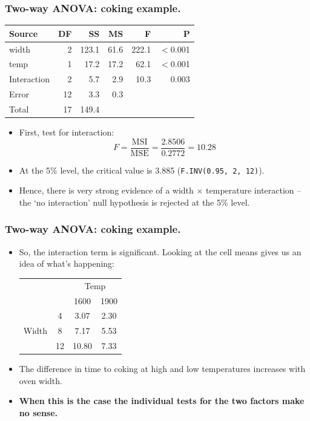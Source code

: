 \documentclass[12pt,xcolor=dvipsnames,handout,mathserif,aspectratio=169]{beamer}
\begin{document}
\begin{frame}
\frametitle{Two-way ANOVA: coking example.}
\begin{center}
\begin{tabular}{lrrrrr} \hline
Source    &   DF &      SS  &     MS  &     F &     P\\\hline
width      &   2 & 123.1  &61.6  &222.1  & $<$0.001\\
temp        &  1   &17.2  &17.2  & 62.1  & $<$0.001\\
Interaction &  2   & 5.7  & 2.9   &10.3  &0.003\\
Error       & 12   & 3.3  & 0.3 &&\\\hline
Total      &  17 & 149.4 &&&\\\hline
\end{tabular}
\end{center}
\vspace*{0.5cm}
\begin{itemize}
\item First, test for interaction:
$$F = \frac{\mbox{MSI}}{\mbox{MSE}}  = \frac{2.8506}{0.2772} = 10.28$$
\item At the 5\% level, the critical value is 3.885 (\texttt{F.INV(0.95, 2, 12)}).
\vspace{0.2cm}
\item Hence, there is very strong evidence of a width $\times$ temperature interaction -- the `no interaction' null hypothesis is rejected at the 5\% level.
\end{itemize}
\end{frame}


\begin{frame}
\frametitle{Two-way ANOVA: coking example.}
\begin{itemize}
\item So, the interaction term is significant. Looking at the cell means gives us an idea of what's happening:
\vspace{0.2cm}
\begin{center}
\begin{tabular}{cc|cc}
& & \multicolumn{2}{c}{Temp}\\
  &  &    1600  &   1900\\\hline
&4  & 3.07 & 2.30\\
Width &8   &7.17 & 5.53\\
&12 &10.80 & 7.33\\\hline
\end{tabular}
\end{center}
\vspace{0.2cm}
\item The difference in time to coking at high and low temperatures increases with oven width.
\vspace{0.2cm}
\item \textbf{When this is the case the individual tests for the two factors make no sense.}
\end{itemize}
\end{frame}
\end{document}
